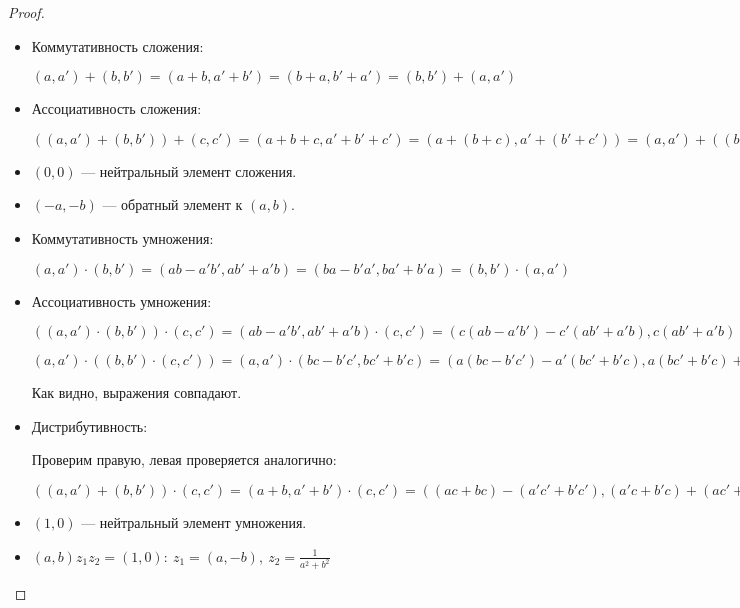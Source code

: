 \begin{proof}
    \begin{itemize}
        \item Коммутативность сложения:
        
        $(a, a') + (b, b') = (a + b, a' + b') = (b + a, b' + a') = (b, b') + (a, a')$
        
        \item Ассоциативность сложения:
        
        $((a, a') + (b, b')) + (c, c') = (a + b + c, a' + b' + c') = (a + (b + c), a' + (b' + c')) = (a, a') + ((b, b') + (c, c'))$
        
        \item $(0, 0)$ --- нейтральный элемент сложения.
        
        \item $(-a, -b)$ --- обратный элемент к $(a, b)$.
        
        \item Коммутативность умножения:
        
        $(a, a') \cdot (b, b') = (ab - a'b', ab' + a'b) = (ba - b'a', ba' + b'a) = (b, b') \cdot (a, a')$
        
        \item Ассоциативность умножения: 
        
        $((a, a') \cdot (b, b')) \cdot (c, c') = (ab - a'b', ab' + a'b) \cdot (c, c') = (c(ab - a'b') - c'(ab' + a'b), c(ab' + a'b) + c'(ab - a'b')) = (cab - ca'b' - c'ab' - c'a'b, cab' + ca'b + c'ab - c'a'b') = (abc - a'b'c - ab'c' - a'bc', abc' + ab'c + abc' - a'b'c')$

        $(a, a') \cdot ((b, b') \cdot (c, c')) = (a, a') \cdot (bc - b'c', bc' + b'c) = (a(bc - b'c') - a'(bc' + b'c), a(bc' + b'c) + a'(bc - b'c')) = (abc - a'b'c - ab'c' - a'bc', abc' + ab'c + abc' - a'b'c')$

        Как видно, выражения совпадают.
        
        \item Дистрибутивность:
        
        Проверим правую, левая проверяется аналогично:

        $((a, a') + (b, b')) \cdot (c, c') = (a + b, a' + b') \cdot (c, c') = ((ac + bc) - (a'c' + b'c'), (a'c + b'c) + (ac' + bc')) = (ac - a'c', a'c + ac') + (bc - b'c', b'c + bc') = (a, a') \cdot (c, c') + (b, b') \cdot (c, c')$
        
        \item $(1, 0)$ --- нейтральный элемент умножения.
        
        \item $(a, b) z_1 z_2 = (1, 0):~z_1 = (a, -b),~z_2=\frac{1}{a^2+b^2}$
    \end{itemize}
\end{proof}

